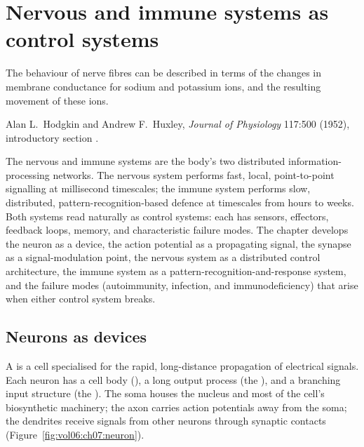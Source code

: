 \chapter{Nervous and immune systems as control systems}
\label{vol06:ch07}

\epigraph{The behaviour of nerve fibres can be described in terms of
the changes in membrane conductance for sodium and potassium ions,
and the resulting movement of these ions.}{Alan L.\ Hodgkin and
Andrew F.\ Huxley, \emph{Journal of Physiology} 117:500 (1952),
introductory section \cite[p.~500]{paper:v6c07-hodgkin-huxley-1952}.}


\noindent
The nervous and immune systems are the body's two distributed
information-processing networks. The nervous system performs fast,
local, point-to-point signalling at millisecond timescales; the immune
system performs slow, distributed, pattern-recognition-based defence
at timescales from hours to weeks. Both systems read naturally as
control systems: each has sensors, effectors, feedback loops, memory,
and characteristic failure modes. The chapter develops the neuron as a
device, the action potential as a propagating signal, the synapse as a
signal-modulation point, the nervous system as a distributed control
architecture, the immune system as a pattern-recognition-and-response
system, and the failure modes (autoimmunity, infection, and
immunodeficiency) that arise when either control system breaks.

\section{Neurons as devices}

A  is a cell specialised for the rapid, long-distance
propagation of electrical signals. Each neuron has a cell body
(), a long output process (the ), and a
branching input structure (the ). The soma
houses the nucleus and most of the cell's biosynthetic machinery;
the axon carries action potentials away from the soma; the dendrites
receive signals from other neurons through synaptic contacts
(Figure~\ref{fig:vol06:ch07:neuron}).

